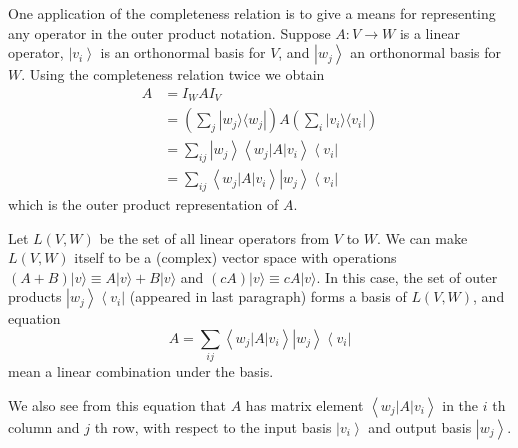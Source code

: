 One application of the completeness relation is to give a means for representing any operator in the outer product notation.
Suppose $A: V \rightarrow W$ is a linear operator, $\left|v_{i}\right\rangle$ is an orthonormal basis for $V$, and $\left|w_{j}\right\rangle$ an orthonormal basis for $W$. Using the completeness relation twice we obtain
$$
\begin{aligned}
A & =I_{W} A I_{V} \\
& = \left(\sum_{j}|w_{j}\rangle\langle w_{j}|\right) A  \left(\sum_{i}|v_{i}\rangle\langle v_{i}|\right)\\
& =\sum_{i j}\left|w_{j}\right\rangle\left\langle w_{j}|A| v_{i}\right\rangle\left\langle v_{i}\right| \\
& =\sum_{i j}\left\langle w_{j}|A| v_{i}\right\rangle\left|w_{j}\right\rangle\left\langle v_{i}\right|
\end{aligned}
$$
which is the outer product representation of $A$. 

Let $L(V,W)$ be the set of all linear operators from $V$ to $W$.
We can make $L(V,W)$ itself to be a (complex) vector space with operations $(A +B) |v\rangle \equiv A |v\rangle + B |v\rangle$ and $(c A) |v\rangle \equiv c A |v\rangle$. 
In this case, the set of outer products $\left|w_{j}\right\rangle\left\langle v_{i}\right|$ (appeared in last paragraph) forms a basis of $L(V,W)$, and equation 
$$
A =\sum_{i j}\left\langle w_{j}|A| v_{i}\right\rangle\left|w_{j}\right\rangle\left\langle v_{i}\right|
$$
mean a linear combination under the basis.

We also see from this equation that $A$ has matrix element $\left\langle w_{j}|A| v_{i}\right\rangle$ in the $i$ th column and $j$ th row, with respect to the input basis $\left|v_{i}\right\rangle$ and output basis $\left|w_{j}\right\rangle$.




